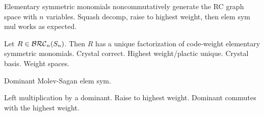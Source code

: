 \documentclass{amsart}
\newtheorem{lemma}{Lemma}[subsection]
\theoremstyle{definition}
\theoremstyle{remark}
\numberwithin{equation}{subsection}
\newcommand{\hr}{\mathtt{ht}}
\begin{document}
Elementary symmetric monomials noncommutatively generate the RC graph space with $n$ variables. Squash decomp, raise to highest weight, then elem sym mul works as expected.

Let $R\in \mathcal{BRC}_n(S_n)$. Then $R$ has a unique factorization of code-weight elementary symmetric monomials. Crystal correct. Highest weight/plactic unique. Crystal basis. Weight spaces.

Dominant Molev-Sagan elem sym.

Left multiplication by a dominant. Raise to highest weight. Dominant commutes with the highest weight.



\end{document}

